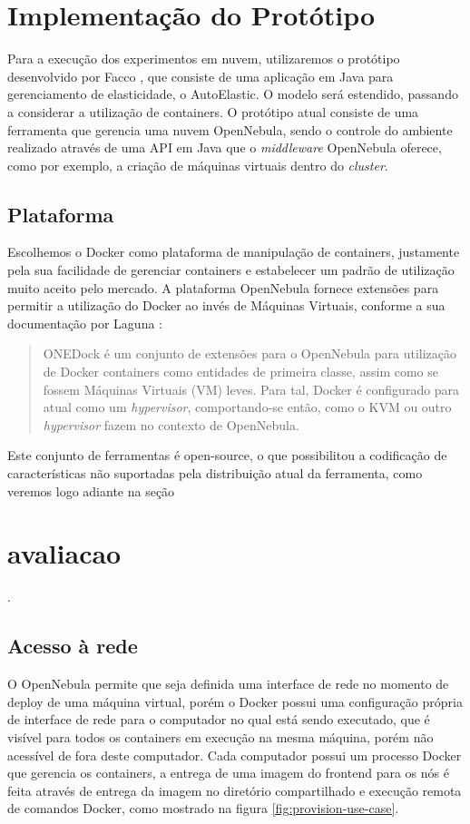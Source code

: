 \documentclass[twoside,english,brazilian]{UNISINOSartigo}
\begin{document}
\section{Implementação do Protótipo}
\label{prototype}

Para a execução dos experimentos em nuvem, utilizaremos o protótipo desenvolvido por Facco , que consiste de uma aplicação em Java para gerenciamento de elasticidade, o AutoElastic. O modelo será estendido, passando a considerar a utilização de containers. O protótipo atual consiste de uma ferramenta que gerencia uma nuvem OpenNebula, sendo o controle do ambiente realizado através de uma API em Java que o \textit{middleware} OpenNebula oferece, como por exemplo, a criação de máquinas virtuais dentro do \textit{cluster}. 

\subsection{Plataforma}
Escolhemos o Docker como plataforma de manipulação de containers, justamente pela sua facilidade de gerenciar containers e estabelecer um padrão de utilização muito aceito pelo mercado. A plataforma OpenNebula fornece extensões para permitir a utilização do Docker ao invés de Máquinas Virtuais, conforme a sua documentação por Laguna :

\begin{quote}
ONEDock é um conjunto de extensões para o OpenNebula para utilização de Docker containers como entidades de primeira classe, assim como se fossem Máquinas Virtuais (VM) leves. Para tal, Docker é configurado para atual como um \textit{hypervisor}, comportando-se então, como o KVM ou outro \textit{hypervisor} fazem no contexto de OpenNebula.
\end{quote} 

Este conjunto de ferramentas é open-source, o que possibilitou a codificação de características não suportadas pela distribuição atual da ferramenta, como veremos logo adiante na seção \section{avaliacao}.

\subsection{Acesso à rede}
O OpenNebula permite que seja definida uma interface de rede no momento de deploy de uma máquina virtual, porém o Docker possui uma configuração própria de interface de rede para o computador no qual está sendo executado, que é visível para todos os containers em execução na mesma máquina, porém não acessível de fora deste computador. Cada computador possui um processo Docker que gerencia os containers, a entrega de uma imagem do frontend para os nós é feita através de entrega da imagem no diretório compartilhado e execução remota de comandos Docker, como mostrado na figura \ref{fig:provision-use-case}.
\end{document}
